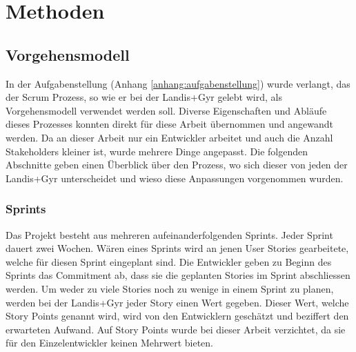\chapter{Methoden}





\section{Vorgehensmodell}\label{vorgehen}
In der Aufgabenstellung (Anhang \ref{anhang:aufgabenstellung}) wurde verlangt, das der Scrum Prozess, so wie er bei der Landis+Gyr gelebt wird, als Vorgehensmodell verwendet werden soll.
Diverse Eigenschaften und Abläufe dieses Prozesses konnten direkt für diese Arbeit übernommen und angewandt werden.
Da an dieser Arbeit nur ein Entwickler arbeitet und auch die Anzahl Stakeholders kleiner ist, wurde mehrere Dinge angepasst.
Die folgenden Abschnitte geben einen Überblick über den Prozess, wo sich dieser von jeden der Landis+Gyr unterscheidet und wieso diese Anpassungen vorgenommen wurden.

\subsection{Sprints}
Das Projekt besteht aus mehreren aufeinanderfolgenden Sprints.
Jeder Sprint dauert zwei Wochen.
Wären eines Sprints wird an jenen User Stories gearbeitete, welche für diesen Sprint eingeplant sind.
Die Entwickler geben zu Beginn des Sprints das Commitment ab, dass sie die geplanten Stories im Sprint abschliessen werden.
Um weder zu viele Stories noch zu wenige in einem Sprint zu planen, werden bei der Landis+Gyr jeder Story einen Wert gegeben.
Dieser Wert, welche Story Points genannt wird, wird von den Entwicklern geschätzt und beziffert den erwarteten Aufwand.
Auf Story Points wurde bei dieser Arbeit verzichtet, da sie für den Einzelentwickler keinen Mehrwert bieten.

